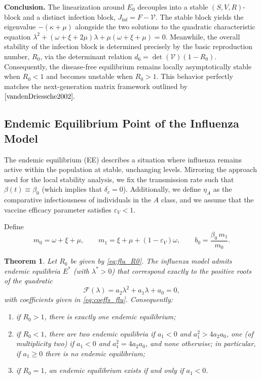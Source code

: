\documentclass[12pt,a4paper]{article}
\newtheorem{theorem}{Theorem}[section]
\theoremstyle{definition}
\theoremstyle{remark}
\begin{document}
\textbf{Conclusion.} The linearization around $E_0$ decouples into a stable $(S,V,R)$-block and a distinct infection block, $J_{\inf}=F-\mathcal V$. The stable block yields the eigenvalue $-(\kappa+\mu)$ alongside the two solutions to the quadratic characteristic equation $\lambda^2+(\omega+\xi+2\mu)\lambda+\mu(\omega+\xi+\mu)=0$. Meanwhile, the overall stability of the infection block is determined precisely by the basic reproduction number, $R_0$, via the determinant relation $d_6=\det(\mathcal V)(1-R_0)$. Consequently, the disease-free equilibrium remains locally asymptotically stable when $R_0<1$ and becomes unstable when $R_0>1$. This behavior perfectly matches the next-generation matrix framework outlined by $\cite{vandenDriessche2002}.$





\subsection{Endemic Equilibrium Point of the Influenza Model}
\label{endemic_flu}

The endemic equilibrium (EE) describes a situation where influenza remains active within the population at stable, unchanging levels. Mirroring the approach used for the local stability analysis, we fix the transmission rate such that $\beta(t)\equiv\beta_0$ (which implies that $\delta_c=0$). Additionally, we define $\eta_A$ as the comparative infectiousness of individuals in the $A$ class, and we assume that the vaccine efficacy parameter satisfies $\varepsilon_V<1$.

 Define
\[
m_0=\omega+\xi+\mu,\qquad m_1=\xi+\mu+(1-\varepsilon_V)\omega,\qquad
b_0=\frac{\beta_0\,m_1}{m_0}.
\]

\begin{theorem}\label{thm:EE_flu}
Let $R_0$ be given by \eqref{eq:flu_R0}. The influenza model admits endemic
equilibria $E^*$ (with $\lambda^*>0$) that correspond exactly to the positive
roots of the quadratic
\begin{equation}\label{eq:quad_flu}
\mathcal F(\lambda)=a_2\lambda^2+a_1\lambda+a_0=0,
\end{equation}
with coefficients given in \eqref{eq:coeffs_flu}. Consequently:
\begin{enumerate}[label=(\roman*)]
\item if $R_0>1$, there is exactly one endemic equilibrium;
\item if $R_0<1$, there are two endemic equilibria if
$a_1<0$ and $a_1^2>4a_2a_0$, one (of multiplicity two) if $a_1<0$ and
$a_1^2=4a_2a_0$, and none otherwise; in particular, if $a_1\ge 0$ there is no
endemic equilibrium;
\item if $R_0=1$, an endemic equilibrium exists if and only if $a_1<0$.
\end{enumerate}
\end{theorem}
\end{document}
